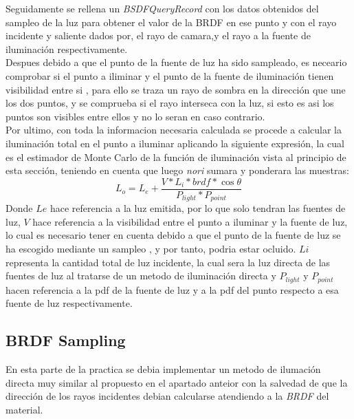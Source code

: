 \documentclass[10pt,oneside,a4paper]{article}
\begin{document}
Seguidamente se rellena un \textit{BSDFQueryRecord} con los datos obtenidos del sampleo de la luz para obtener el valor de la BRDF en ese punto y con el rayo incidente y saliente dados por, el rayo de camara,y el rayo a la fuente de iluminación respectivamente.\\

Despues debido a que el punto de la fuente de luz ha sido sampleado, es neceario comprobar si el punto a iliminar y el punto de la fuente de iluminación tienen visibilidad entre si , para ello se traza un rayo de sombra en la dirección que une los dos puntos, y se comprueba si el rayo interseca con la luz, si esto es asi los puntos son visibles entre ellos y no lo seran en caso contrario.\\

Por ultimo, con toda la informacion necesaria calculada se procede a calcular la iluminación total en el punto a iluminar aplicando la siguiente expresión, la cual es el estimador de Monte Carlo de la función de iluminación vista al principio de esta sección, teniendo en cuenta que luego \textit{nori} sumara y ponderara las muestras:
 $$L_o = L_e  + \frac{ V * L_i * brdf * \cos{\theta}}{P_{light} * P_{point}}$$ 
Donde $Le$ hace referencia a la luz emitida, por lo que solo tendran las fuentes de luz, $V$ hace referencia a la visibilidad entre el punto a iluminar y la fuente de luz, lo cual es necesario tener en cuenta debido a que el punto de la fuente de luz se ha escogido mediante un sampleo , y por tanto, podria estar ocluido. $Li$ representa la cantidad total de luz incidente, la cual sera la luz directa de las fuentes de luz al tratarse de un metodo de iluminación directa y $P_{light}$ y $P_{point}$ hacen referencia a la pdf de la fuente de luz y a la pdf del punto respecto a esa fuente de luz respectivamente. 
\subsection{BRDF Sampling}
En esta parte de la practica se debia implementar un metodo de ilumación directa muy similar al propuesto en el apartado anteior con la salvedad de que la dirección de los rayos incidentes debian calcularse atendiendo a la \textit{BRDF} del material.\\
\end{document}
